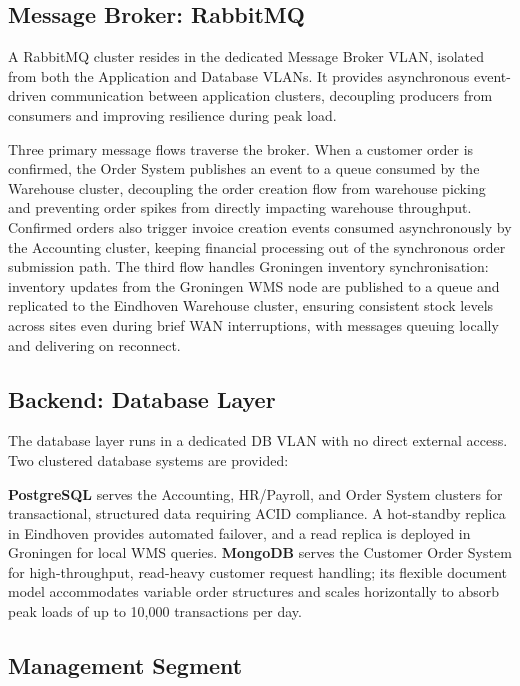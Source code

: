 \subsection{Message Broker: RabbitMQ}

A RabbitMQ cluster resides in the dedicated Message Broker VLAN, isolated from both the Application and Database VLANs. It provides asynchronous event-driven communication between application clusters, decoupling producers from consumers and improving resilience during peak load.

Three primary message flows traverse the broker. When a customer order is confirmed, the Order System publishes an event to a queue consumed by the Warehouse cluster, decoupling the order creation flow from warehouse picking and preventing order spikes from directly impacting warehouse throughput. Confirmed orders also trigger invoice creation events consumed asynchronously by the Accounting cluster, keeping financial processing out of the synchronous order submission path. The third flow handles Groningen inventory synchronisation: inventory updates from the Groningen WMS node are published to a queue and replicated to the Eindhoven Warehouse cluster, ensuring consistent stock levels across sites even during brief WAN interruptions, with messages queuing locally and delivering on reconnect.

\subsection{Backend: Database Layer}

The database layer runs in a dedicated DB VLAN with no direct external access. Two clustered database systems are provided:

\textbf{PostgreSQL} serves the Accounting, HR/Payroll, and Order System clusters for transactional, structured data requiring ACID compliance. A hot-standby replica in Eindhoven provides automated failover, and a read replica is deployed in Groningen for local WMS queries. \textbf{MongoDB} serves the Customer Order System for high-throughput, read-heavy customer request handling; its flexible document model accommodates variable order structures and scales horizontally to absorb peak loads of up to 10,000 transactions per day.

\subsection{Management Segment}

